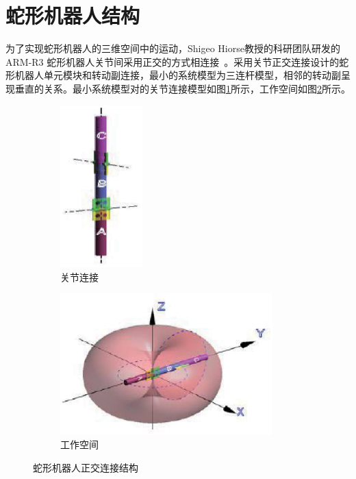 \section{蛇形机器人结构}
为了实现蛇形机器人的三维空间中的运动，Shigeo Hiorse教授的科研团队研发的ARM-R3 蛇形机器人关节间采用正交的方式相连接~\cite{Prautsch1999Control}。采用关节正交连接设计的蛇形机器人单元模块和转动副连接，最小的系统模型为三连杆模型，相邻的转动副呈现垂直的关系。最小系统模型对的关节连接模型如图\ref{fig:connect}所示，工作空间如图\ref{fig:space}所示。
\begin{figure}[h!] %
	\begin{subfigure}{0.5\textwidth}
		\centering
		\includegraphics[width=0.35\textwidth,height=0.15\textheight]{figure/chap03/struct.eps}
		\caption{关节连接}
		\label{fig:connect}
	\end{subfigure}
	\begin{subfigure}{0.5\textwidth}
		\centering
		\includegraphics[width=0.9\textwidth,height=0.15\textheight]{figure/chap03/space.eps}
		\caption{工作空间}
		\label{fig:space}
	\end{subfigure}
	\caption{蛇形机器人正交连接结构}
	\label{fig:Orthogonal}
\end{figure}
